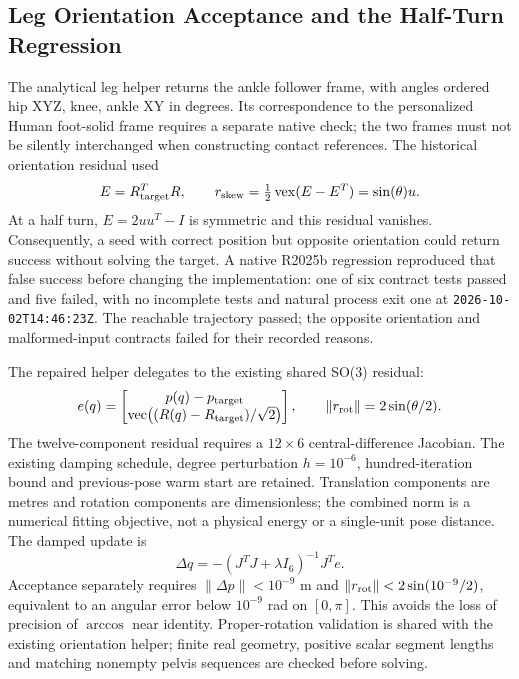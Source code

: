 \documentclass[11pt,a4paper]{article}
\begin{document}
\subsection{Leg Orientation Acceptance and the Half-Turn Regression}
The analytical leg helper returns the ankle follower frame, with angles
ordered hip XYZ, knee, ankle XY in degrees. Its correspondence to the
personalized Human foot-solid frame requires a separate native check; the
two frames must not be silently interchanged when constructing contact
references. The historical orientation residual used
\begin{equation}
 E=R_{\rm target}^{T}R,\qquad
 r_{\rm skew}=\tfrac12\operatorname{vex}(E-E^{T})
             =\sin(\theta)u.
\end{equation}
At a half turn, $E=2uu^{T}-I$ is symmetric and this residual vanishes.
Consequently, a seed with correct position but opposite orientation could
return success without solving the target. A native R2025b regression
reproduced that false success before changing the implementation: one of
six contract tests passed and five failed, with no incomplete tests and
natural process exit one at \texttt{2026-10-02T14:46:23Z}. The reachable
trajectory passed; the opposite orientation and malformed-input contracts
failed for their recorded reasons.

The repaired helper delegates to the existing shared SO(3) residual:
\begin{equation}
 e(q)=\begin{bmatrix}p(q)-p_{\rm target}\\
 \operatorname{vec}\bigl((R(q)-R_{\rm target})/\sqrt{2}\bigr)\end{bmatrix},
 \qquad \|r_{\rm rot}\|=2\sin(\theta/2).
\end{equation}
The twelve-component residual requires a $12\times6$ central-difference
Jacobian. The existing damping schedule, degree perturbation
$h=10^{-6}$, hundred-iteration bound and previous-pose warm start are
retained. Translation components are metres and rotation components are
dimensionless; the combined norm is a numerical fitting objective, not a
physical energy or a single-unit pose distance. The damped update is
\begin{equation}
 \Delta q=-(J^{T}J+\lambda I_6)^{-1}J^{T}e.
\end{equation}
Acceptance separately requires $\|\Delta p\|<10^{-9}$ m and
$\|r_{\rm rot}\|<2\sin(10^{-9}/2)$, equivalent to an angular error below
$10^{-9}$ rad on $[0,\pi]$. This avoids the loss of precision of
$\arccos$ near identity. Proper-rotation validation is shared with the
existing orientation helper; finite real geometry, positive scalar segment
lengths and matching nonempty pelvis sequences are checked before solving.
\end{document}
